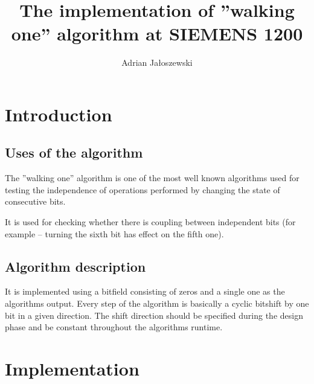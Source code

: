 \documentclass[a4paper, 12pt]{article}
\author{Adrian Jałoszewski}
\title{The implementation of ''walking one'' algorithm at SIEMENS 1200}
\date{}
\begin{document}
    \maketitle
    \section{Introduction}
        \subsection{Uses of the algorithm}
            The ''walking one'' algorithm is one of the most well known
            algorithms used for testing the independence of operations
            performed by changing the state of consecutive bits.
            
            It is used for checking whether there is coupling between 
            independent bits (for example -- turning the sixth bit has effect on
            the fifth one).
        \subsection{Algorithm description}
            
            It is implemented using a bitfield consisting of zeros and a single 
            one as the algorithms output.  Every step of the algorithm is 
            basically a cyclic bitshift by one bit in a given direction. The
            shift direction should be specified during the design phase and be
            constant throughout the algorithms runtime.
    \section{Implementation}
\end{document}
